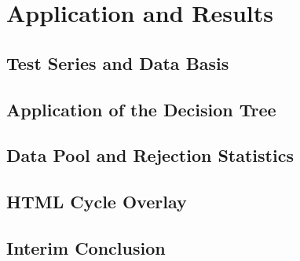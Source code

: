 \chapter{Application and Results}
\label{kap:Analyse}


\section{Test Series and Data Basis}
\label{sec:Analyse_DataBasis}

\section{Application of the Decision Tree}
\label{sec:Analyse_DecisionTree}

\section{Data Pool and Rejection Statistics}
\label{sec:Analyse_RejectionStats}

\section{HTML Cycle Overlay}
\label{sec:Analyse_HTMLOverlay}

\section{Interim Conclusion}
\label{sec:Analyse_Interim}

